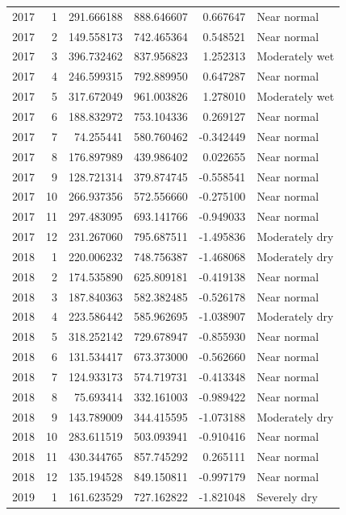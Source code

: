 \begin{tabular}{rrrrrl}
2017 & 1 & 291.666188 & 888.646607 & 0.667647 & Near normal \\
2017 & 2 & 149.558173 & 742.465364 & 0.548521 & Near normal \\
2017 & 3 & 396.732462 & 837.956823 & 1.252313 & Moderately wet \\
2017 & 4 & 246.599315 & 792.889950 & 0.647287 & Near normal \\
2017 & 5 & 317.672049 & 961.003826 & 1.278010 & Moderately wet \\
2017 & 6 & 188.832972 & 753.104336 & 0.269127 & Near normal \\
2017 & 7 & 74.255441 & 580.760462 & -0.342449 & Near normal \\
2017 & 8 & 176.897989 & 439.986402 & 0.022655 & Near normal \\
2017 & 9 & 128.721314 & 379.874745 & -0.558541 & Near normal \\
2017 & 10 & 266.937356 & 572.556660 & -0.275100 & Near normal \\
2017 & 11 & 297.483095 & 693.141766 & -0.949033 & Near normal \\
2017 & 12 & 231.267060 & 795.687511 & -1.495836 & Moderately dry \\
2018 & 1 & 220.006232 & 748.756387 & -1.468068 & Moderately dry \\
2018 & 2 & 174.535890 & 625.809181 & -0.419138 & Near normal \\
2018 & 3 & 187.840363 & 582.382485 & -0.526178 & Near normal \\
2018 & 4 & 223.586442 & 585.962695 & -1.038907 & Moderately dry \\
2018 & 5 & 318.252142 & 729.678947 & -0.855930 & Near normal \\
2018 & 6 & 131.534417 & 673.373000 & -0.562660 & Near normal \\
2018 & 7 & 124.933173 & 574.719731 & -0.413348 & Near normal \\
2018 & 8 & 75.693414 & 332.161003 & -0.989422 & Near normal \\
2018 & 9 & 143.789009 & 344.415595 & -1.073188 & Moderately dry \\
2018 & 10 & 283.611519 & 503.093941 & -0.910416 & Near normal \\
2018 & 11 & 430.344765 & 857.745292 & 0.265111 & Near normal \\
2018 & 12 & 135.194528 & 849.150811 & -0.997179 & Near normal \\
2019 & 1 & 161.623529 & 727.162822 & -1.821048 & Severely dry \\

\end{tabular}
